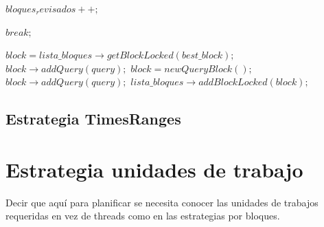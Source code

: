 \begin{algorithm}[!th]
\begin{algorithmic}[1]
			\STATE $bloques_revisados++;$
			
				\STATE $break;$
			\ENDIF
			
		\ENDIF
		
	\ENDFOR
	
			\STATE $block = lista\_bloques \rightarrow getBlockLocked(best\_block);$
			\STATE $block \rightarrow addQuery(query);$
		\ELSE
			\STATE $block = new QueryBlock();$
			\STATE $block \rightarrow addQuery(query);$
			\STATE $lista\_bloques \rightarrow addBlockLocked(block);$
			
		\ENDIF	
	\ENDIF

\end{algorithmic}
\end{algorithm}




\subsection{Estrategia TimesRanges}
\label{scheduling:fr}


\section{Estrategia unidades de trabajo}
\label{scheduling:unidadestrabajo}
Decir que aquí para planificar se necesita conocer las unidades de trabajos requeridas en vez de threads como en las estrategias por bloques.

